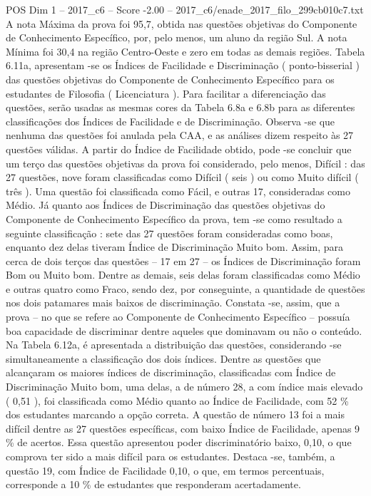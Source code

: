 \begin{textsample}{POS Dim 1 – 2017\_c6 – Score -2.00 – 2017\_c6/enade\_2017\_filo\_299cb010c7.txt}
A nota Máxima da prova foi 95,7, obtida nas questões objetivas do Componente de Conhecimento Específico, por, pelo menos, um aluno da região Sul.
A nota Mínima foi 30,4 na região Centro-Oeste e zero em todas as demais regiões.
Tabela 6.11a, apresentam -se os Índices de Facilidade e Discriminação ( ponto-bisserial ) das questões objetivas do Componente de Conhecimento Específico para os estudantes de Filosofia ( Licenciatura ).
Para facilitar a diferenciação das questões, serão usadas as mesmas cores da Tabela 6.8a e 6.8b para as diferentes classificações dos Índices de Facilidade e de Discriminação.
Observa -se que nenhuma das questões foi anulada pela CAA, e as análises dizem respeito às 27 questões válidas.
A partir do Índice de Facilidade obtido, pode -se concluir que um terço das questões objetivas da prova foi considerado, pelo menos, Difícil : das 27 questões, nove foram classificadas como Difícil ( seis ) ou como Muito difícil ( três ).
Uma questão foi classificada como Fácil, e outras 17, consideradas como Médio.
Já quanto aos Índices de Discriminação das questões objetivas do Componente de Conhecimento Específico da prova, tem -se como resultado a seguinte classificação : sete das 27 questões foram consideradas como boas, enquanto dez delas tiveram Índice de Discriminação Muito bom.
Assim, para cerca de dois terços das questões – 17 em 27 – os Índices de Discriminação foram Bom ou Muito bom.
Dentre as demais, seis delas foram classificadas como Médio e outras quatro como Fraco, sendo dez, por conseguinte, a quantidade de questões nos dois patamares mais baixos de discriminação.
Constata -se, assim, que a prova – no que se refere ao Componente de Conhecimento Específico – possuía boa capacidade de discriminar dentre aqueles que dominavam ou não o conteúdo.
Na Tabela 6.12a, é apresentada a distribuição das questões, considerando -se simultaneamente a classificação dos dois índices.
Dentre as questões que alcançaram os maiores índices de discriminação, classificadas com Índice de Discriminação Muito bom, uma delas, a de número 28, a com índice mais elevado ( 0,51 ), foi classificada como Médio quanto ao Índice de Facilidade, com 52 \% dos estudantes marcando a opção correta.
A questão de número 13 foi a mais difícil dentre as 27 questões específicas, com baixo Índice de Facilidade, apenas 9 \% de acertos.
Essa questão apresentou poder discriminatório baixo, 0,10, o que comprova ter sido a mais difícil para os estudantes.
Destaca -se, também, a questão 19, com Índice de Facilidade 0,10, o que, em termos percentuais, corresponde a 10 \% de estudantes que responderam acertadamente.

\end{textsample}
